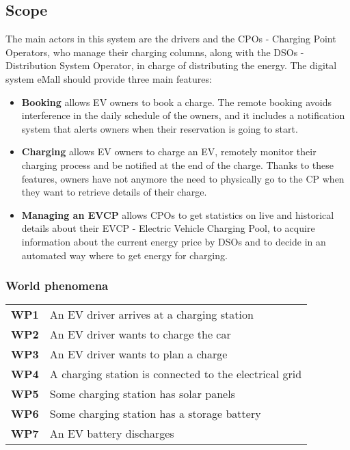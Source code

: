 \subsection{Scope}
The main actors in this system are the drivers and the CPOs - Charging Point Operators, who manage their charging columns, along with the DSOs - Distribution System Operator, in charge of distributing the energy.
The digital system eMall should provide three main features:
\begin{itemize}
    \item \textbf{Booking} allows EV owners to book a charge. The remote booking avoids interference
          in the daily schedule of the owners, and it includes a notification
          system that alerts owners when their reservation is going to start.
    \item \textbf{Charging} allows EV owners to charge an EV, remotely monitor their charging
          process and be notified at the end of the charge.
          Thanks to these features, owners have not anymore the need to
          physically go to the CP when they want to retrieve details of their charge.
    \item  \textbf{Managing an EVCP} allows CPOs to get statistics on live and historical details
          about their EVCP - Electric Vehicle Charging Pool, to acquire information about the current energy price by
          DSOs and to decide in an automated way where to get energy for charging.
\end{itemize}




\subsubsection{World phenomena}
\begin{table}[H]
    \begin{tabularx}{\textwidth}{cX}
        \toprule
        \textbf{WP1} & An EV driver arrives at a charging station             \\
        \textbf{WP2} & An EV driver wants to charge the car                   \\
        \textbf{WP3} & An EV driver wants to plan a charge                    \\
        \textbf{WP4} & A charging station is connected to the electrical grid \\
        \textbf{WP5} & Some charging station has solar panels                 \\
        \textbf{WP6} & Some charging station has a storage battery            \\
        \textbf{WP7} & An EV battery discharges                               \\ \bottomrule
    \end{tabularx}
\end{table}
